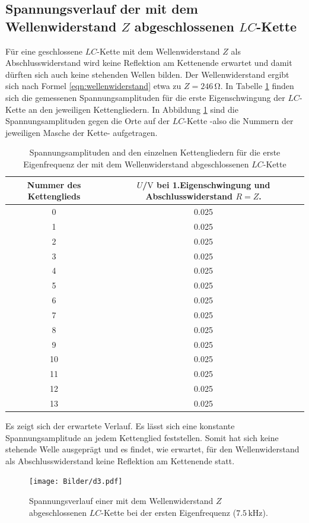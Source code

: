 \subsection{Spannungsverlauf der mit dem Wellenwiderstand $Z$ abgeschlossenen $LC$-Kette}
Für eine geschlossene $LC$-Kette mit dem Wellenwiderstand $Z$ als Abschlusswiderstand wird keine Reflektion am Kettenende erwartet und damit dürften sich auch keine stehenden Wellen bilden.
Der Wellenwiderstand ergibt sich nach Formel \eqref{eqn:wellenwiderstand} etwa zu $Z=246 \,\si{\ohm}$.
In Tabelle \ref{tab:lame} finden sich die gemessenen Spannungsamplituden für die erste Eigenschwingung der $LC$-Kette an den jeweiligen Kettengliedern.
In Abbildung \ref{fig:really?!} sind die Spannungsamplituden gegen die Orte auf der $LC$-Kette -also die Nummern der jeweiligen Masche der Kette- aufgetragen.
\begin{table}
  \centering
\caption{Spannungsamplituden and den einzelnen Kettengliedern für die erste Eigenfrequenz der mit dem Wellenwiderstand abgeschlossenen $LC$-Kette}
\label{tab:lame}
\begin{tabular}{cc}
\toprule
Nummer des Kettenglieds & $U$/$\si{\volt}$ bei 1.Eigenschwingung und Abschlusswiderstand $R=Z$. \\
\midrule
0 & 0.025 \\
1 & 0.025 \\
2 & 0.025 \\
3 & 0.025 \\
4 & 0.025 \\
5 & 0.025 \\
6 & 0.025 \\
7 & 0.025 \\
8 & 0.025 \\
9 & 0.025 \\
10 & 0.025 \\
11 & 0.025 \\
12 & 0.025 \\
13 & 0.025 \\
\bottomrule
\end{tabular}
\end{table}

Es zeigt sich der erwartete Verlauf. Es lässt sich eine konstante Spannungsamplitude an jedem Kettenglied feststellen.
Somit hat sich keine stehende Welle ausgeprägt und es findet, wie erwartet, für den Wellenwiderstand als Abschlusswiderstand keine Reflektion am Kettenende statt.


\begin{figure}
  \centering
 \texttt{[image: Bilder/d3.pdf]}
  \caption{Spannungsverlauf einer mit dem Wellenwiderstand $Z$ abgeschlossenen $LC$-Kette bei der ersten Eigenfrequenz ($7.5 \,\si{\kilo\Hz}$).}
  \label{fig:really?!}
\end{figure}
